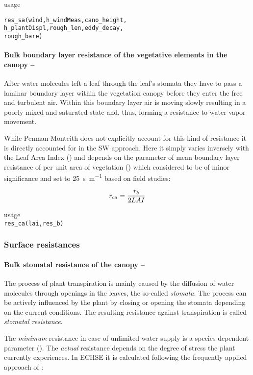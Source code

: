 \noindent
usage
\begin{verbatim}
res_sa(wind,h_windMeas,cano_height,
h_plantDispl,rough_len,eddy_decay,
rough_bare)
\end{verbatim}


\paragraph{Bulk boundary layer resistance of the vegetative elements in the canopy -- \resCA{}}\label{sec:et:res:rca}
After water molecules left a leaf through the leaf's stomata they have to pass a laminar boundary layer within the vegetation canopy before they enter the free and turbulent air. Within this boundary layer air is moving slowly resulting in a poorly mixed and saturated state and, thus, forming a resistance to water vapor movement.

While Penman-Monteith does not explicitly account for this kind of resistance it is directly accounted for in the SW approach. Here it simply varies inversely with the Leaf Area Index (\leafAreaIndex{}) and depends on the parameter of mean boundary layer resistance of per unit area of vegetation (\resMeanBound{}) which \citet{Shuttleworth1985} considered to be of minor significance and set to \SI{25}{\second\per\metre} based on field studies:

\begin{equation} \label{eqn:et:res:rca}
r_{ca} = \frac{r_{b}}{2 LAI}
\end{equation}

\noindent
usage\\
\verb!res_ca(lai,res_b)!


\subsubsection{Surface resistances}
\paragraph{Bulk stomatal resistance of the canopy -- \resCanopy{}} \label{sec:et:res:rcs}
The process of plant transpiration is mainly caused by the diffusion of water molecules through openings in the leaves, the so-called \emph{stomata}. The process can be actively influenced by the plant by closing or opening the stomata depending on the current conditions. The resulting resistance against transpiration is called \emph{stomatal resistance}.

The \emph{minimum} resistance in case of unlimited water supply is a species-dependent parameter (\resLeafMin{}). The \emph{actual} resistance depends on the degree of stress the plant currently experiences. In ECHSE it is calculated following the frequently applied approach of \citet{Jarvis1976}:

